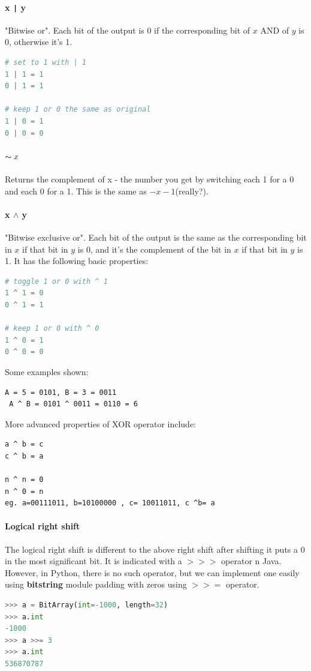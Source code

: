 \documentclass[../main.tex]{subfiles}
\begin{document}
\paragraph{x \texttt{|} y} "Bitwise or".  Each bit of the output is 0 if the corresponding bit of $x$ AND of $y$ is 0, otherwise it's 1.
\begin{lstlisting}[language=Python]
# set to 1 with | 1
1 | 1 = 1
0 | 1 = 1

# keep 1 or 0 the same as original
1 | 0 = 1
0 | 0 = 0
\end{lstlisting}

\paragraph{$\thicksim x
$} Returns the complement of x - the number you get by switching each 1 for a 0 and each 0 for a 1. This is the same as $-x - 1$(really?). 

\paragraph{x $\wedge$ y} "Bitwise exclusive or". Each bit of the output is the same as the corresponding bit in $x$ if that bit in $y$ is 0, and it's the complement of the bit in $x$ if that bit in $y$ is 1. It has the following basic properties:
\begin{lstlisting}[language=Python]
# toggle 1 or 0 with ^ 1
1 ^ 1 = 0
0 ^ 1 = 1

# keep 1 or 0 with ^ 0
1 ^ 0 = 1
0 ^ 0 = 0
\end{lstlisting}
Some examples shown: 
\begin{lstlisting}
A = 5 = 0101, B = 3 = 0011
 A ^ B = 0101 ^ 0011 = 0110 = 6
 \end{lstlisting}
More advanced properties of XOR operator include:
 \begin{lstlisting}
a ^ b = c 
c ^ b = a

n ^ n = 0
n ^ 0 = n
eg. a=00111011, b=10100000 , c= 10011011, c ^b= a
 \end{lstlisting}

\paragraph{Logical right shift} The logical right shift is different to the above right shift after shifting it puts a 0 in the most significant bit. It is indicated with a $>>>$ operator n Java. However, in Python, there is no such operator, but we can implement one easily using \textbf{bitstring} module padding with zeros using $>>=$ operator.
\begin{lstlisting}[language=Python]
>>> a = BitArray(int=-1000, length=32)
>>> a.int
-1000
>>> a >>= 3
>>> a.int
536870787
\end{lstlisting}
\end{document}

